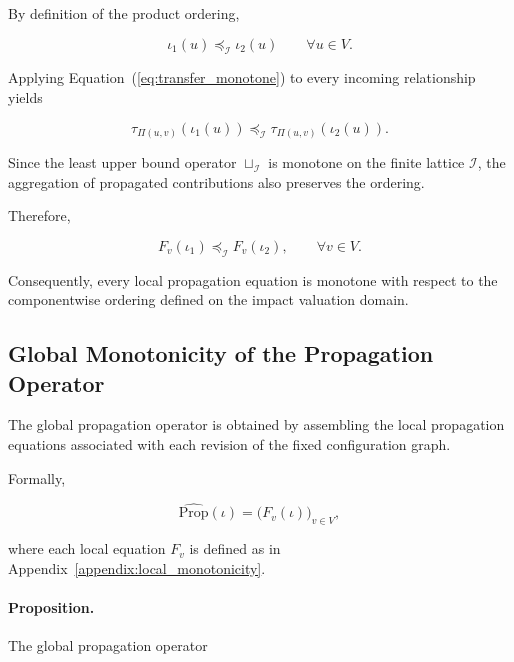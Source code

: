 \documentclass[10pt]{article}
\begin{document}
By definition of the product ordering,

\begin{equation}
\iota_1(u)
\preceq_{\mathcal I}
\iota_2(u)
\qquad
\forall u\in V.
\end{equation}

Applying Equation~(\ref{eq:transfer_monotone}) to every incoming relationship
yields

\begin{equation}
\tau_{\Pi(u,v)}
(
\iota_1(u)
)
\preceq_{\mathcal I}
\tau_{\Pi(u,v)}
(
\iota_2(u)
).
\end{equation}

Since the least upper bound operator $\sqcup_{\mathcal I}$
is monotone on the finite lattice $\mathcal I$, the aggregation of propagated contributions also preserves the ordering.

Therefore,

\begin{equation}
	\label{eq:local_monotone}
	F_v(\iota_1)
	\preceq_{\mathcal I}
	F_v(\iota_2),
	\qquad
	\forall v\in V.
\end{equation}

Consequently, every local propagation equation is monotone with respect to the componentwise ordering defined on the impact valuation domain.

\subsection{Global Monotonicity of the Propagation Operator}
\label{appendix:global_monotonicity}
The global propagation operator is obtained by assembling the local propagation equations associated with each revision of the fixed configuration graph.

Formally,

\begin{equation}
	\label{eq:global_operator}
	\widehat{\mathrm{Prop}}(\iota)
	=
	\bigl(
	F_v(\iota)
	\bigr)_{v\in V},
\end{equation}

where each local equation $F_v$ is defined as in
Appendix~\ref{appendix:local_monotonicity}.

\paragraph{Proposition.}
The global propagation operator
\end{document}
